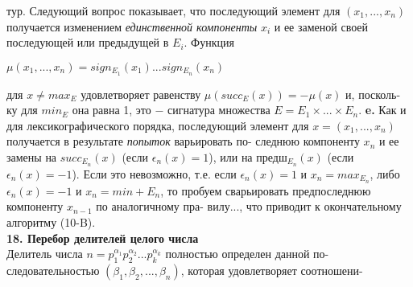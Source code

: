 тур.\newline
\hspace*{15pt}Следующий  вопрос  показывает,  что  последующий элемент для\linebreak 
$(x_1,...,x_n)$ получается изменением \textit{единственной компоненты} $x_i$ и ее\linebreak 
заменой своей последующей или предыдущей в $E_i$. Функция
\begin{center}
$\mu(x_1,...,x_n)=sign_{E_1}(x_1)...sign_{E_n}(x_n)$
\end{center}
для $x\neq max_E$ удовлетворяет равенству $\mu(succ_E(x))=-\mu(x)$ и, посколь-\linebreak
ку для $min_E$ она равна 1, это $-$ сигнатура множества $E=E_1\times...\times E_n$.\linebreak
\hspace*{15pt}\textbf{e.} Как и для лексикографического порядка, последующий элемент\linebreak
для $x=(x_1,...,x_n)$ получается в результате \textit{попыток} варьировать по-\linebreak
следнюю компоненту $x_n$ и ее замены на $succ_{E_n}(x)$ (если $\epsilon_n(x)=1$),\linebreak
или на предш$_{E_n}(x)$ (если $\epsilon_n(x)=-1$). Если это невозможно, т.е. если\linebreak
$\epsilon_n(x)=1$ и $x_n=max_{E_n}$, либо $\epsilon_n(x)=-1$ и $x_n=min+{E_n}$, то пробуем\linebreak
сварьировать предпоследнюю компоненту $x_{n-1}$ по аналогичному пра-\linebreak
вилу..., что приводит к окончательному алгоритму (10-B).\\

\noindent\textbf{18. Перебор делителей целого числа}\\

\hspace*{15pt}Делитель числа $n=p_1^{\alpha_1}p_2^{\alpha_2}...p_k^{\alpha_k}$ полностью определен данной по-\linebreak
следовательностью $(\beta_1,\beta_2,...,\beta_n)$, которая удовлетворяет соотношени-\linebreak
\newpage



